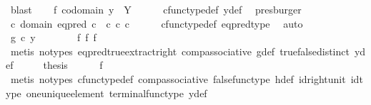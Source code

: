 \begin{isabellebody}
\ blast\isanewline
\ \ \isamarkupfalse%
\ f{}{\isacharcolon}{\kern0pt}\ {\isachardoublequoteopen}codomain\ y{}\ {\isacharequal}{\kern0pt}\ Y{\isachardoublequoteclose}\isanewline
\ \ \ \ \isamarkupfalse%
\ cfunc{\isacharunderscore}{\kern0pt}type{\isacharunderscore}{\kern0pt}def\ y{\isacharunderscore}{\kern0pt}def\ \isamarkupfalse%
\ presburger\isanewline
\ \ \isamarkupfalse%
\ {\isachardoublequoteopen}{\isasymforall}c{\isachardot}{\kern0pt}\ domain\ {\isacharparenleft}{\kern0pt}eq{\isacharunderscore}{\kern0pt}pred\ c{\isacharparenright}{\kern0pt}\ {\isacharequal}{\kern0pt}\ c\ {\isasymtimes}\isactrlsub c\ c{\isachardoublequoteclose}\isanewline
\ \ \ \ \isamarkupfalse%
\ cfunc{\isacharunderscore}{\kern0pt}type{\isacharunderscore}{\kern0pt}def\ eq{\isacharunderscore}{\kern0pt}pred{\isacharunderscore}{\kern0pt}type\ \isamarkupfalse%
\ auto\isanewline
\ \ \isamarkupfalse%
\ \isamarkupfalse%
\ {\isachardoublequoteopen}g\ {\isasymcirc}\isactrlsub c\ y{}\ {\isasymnoteq}\ {\isasymf}{\isachardoublequoteclose}\isanewline
\ \ \ \ \isamarkupfalse%
\ f{}\ f{}\ f{}\ \isamarkupfalse%
\ {\isacharparenleft}{\kern0pt}metis\ {\isacharparenleft}{\kern0pt}no{\isacharunderscore}{\kern0pt}types{\isacharparenright}{\kern0pt}\ eq{\isacharunderscore}{\kern0pt}pred{\isacharunderscore}{\kern0pt}true{\isacharunderscore}{\kern0pt}extract{\isacharunderscore}{\kern0pt}right\ comp{\isacharunderscore}{\kern0pt}associative\ g{\isacharunderscore}{\kern0pt}def\ true{\isacharunderscore}{\kern0pt}false{\isacharunderscore}{\kern0pt}distinct\ y{\isacharunderscore}{\kern0pt}def{\isacharparenright}{\kern0pt}\isanewline
\ \ \isamarkupfalse%
\ \isamarkupfalse%
\ {\isacharquery}{\kern0pt}thesis\isanewline
\ \ \ \ \isamarkupfalse%
\ f{}\ \isamarkupfalse%
\ {\isacharparenleft}{\kern0pt}metis\ {\isacharparenleft}{\kern0pt}no{\isacharunderscore}{\kern0pt}types{\isacharparenright}{\kern0pt}\ cfunc{\isacharunderscore}{\kern0pt}type{\isacharunderscore}{\kern0pt}def\ comp{\isacharunderscore}{\kern0pt}associative\ false{\isacharunderscore}{\kern0pt}func{\isacharunderscore}{\kern0pt}type\ h{\isacharunderscore}{\kern0pt}def\ id{\isacharunderscore}{\kern0pt}right{\isacharunderscore}{\kern0pt}unit{}\ id{\isacharunderscore}{\kern0pt}type\ one{\isacharunderscore}{\kern0pt}unique{\isacharunderscore}{\kern0pt}element\ terminal{\isacharunderscore}{\kern0pt}func{\isacharunderscore}{\kern0pt}type\ y{\isacharunderscore}{\kern0pt}def{\isacharparenright}{\kern0pt}\isanewline

\end{isabellebody}

